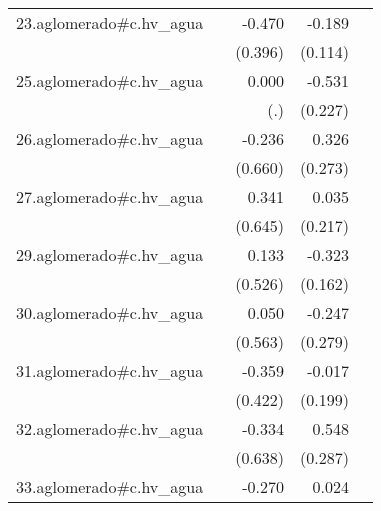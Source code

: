 {\begin{longtable}{l*{4}{D{.}{.}{-1}}}
\addlinespace
23.aglomerado#c.hv\_agua&                     &      -0.470         &      -0.189         &                     \\
            &                     &     (0.396)         &     (0.114)         &                     \\
\addlinespace
25.aglomerado#c.hv\_agua&                     &       0.000         &      -0.531\sym{*}  &                     \\
            &                     &         (.)         &     (0.227)         &                     \\
\addlinespace
26.aglomerado#c.hv\_agua&                     &      -0.236         &       0.326         &                     \\
            &                     &     (0.660)         &     (0.273)         &                     \\
\addlinespace
27.aglomerado#c.hv\_agua&                     &       0.341         &       0.035         &                     \\
            &                     &     (0.645)         &     (0.217)         &                     \\
\addlinespace
29.aglomerado#c.hv\_agua&                     &       0.133         &      -0.323\sym{*}  &                     \\
            &                     &     (0.526)         &     (0.162)         &                     \\
\addlinespace
30.aglomerado#c.hv\_agua&                     &       0.050         &      -0.247         &                     \\
            &                     &     (0.563)         &     (0.279)         &                     \\
\addlinespace
31.aglomerado#c.hv\_agua&                     &      -0.359         &      -0.017         &                     \\
            &                     &     (0.422)         &     (0.199)         &                     \\
\addlinespace
32.aglomerado#c.hv\_agua&                     &      -0.334         &       0.548         &                     \\
            &                     &     (0.638)         &     (0.287)         &                     \\
\addlinespace
33.aglomerado#c.hv\_agua&                     &      -0.270         &       0.024         &                     \\

\end{longtable}}
